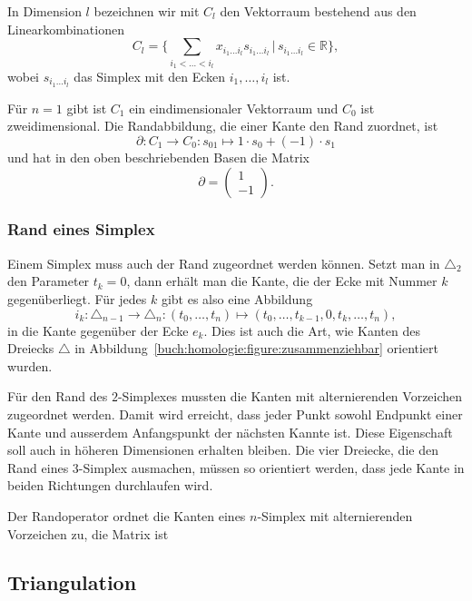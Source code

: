 In Dimension $l$ bezeichnen wir mit $C_l$  den Vektorraum bestehend
aus den Linearkombinationen
\[
C_l
=
\biggl\{
\sum_{i_1<\dots<i_l} x_{i_1\dots i_l} s_{i_1\dots i_l}
\,
\bigg|
\,
s_{i_1\dots i_l}\in\mathbb{R}
\biggr\},
\]
wobei $s_{i_1\dots i_l}$ das Simplex mit den Ecken $i_1,\dots,i_l$ ist.

Für $n=1$ gibt ist $C_1$ ein eindimensionaler Vektorraum und $C_0$
ist zweidimensional.
Die Randabbildung, die einer Kante den Rand zuordnet, ist
\[
\partial
\colon 
C_1\to C_0
:
s_{01}
\mapsto
1\cdot s_0 + (-1)\cdot s_1
\]
und hat in den oben beschriebenden Basen die Matrix
\[
\partial 
=
\begin{pmatrix}
1\\
-1
\end{pmatrix}.
\]

\subsubsection{Rand eines Simplex}
Einem Simplex muss auch der Rand zugeordnet werden können.
Setzt man in $\triangle_2$ den Parameter $t_k=0$, dann erhält
man die Kante,
die der Ecke mit Nummer $k$ gegenüberliegt.
Für jedes $k$ gibt es also eine Abbildung
\[
i_k
\colon
\triangle_{n-1} \to \triangle_n
:
(t_0,\dots,t_n)
\mapsto
(t_0,\dots,t_{k-1},0,t_{k},\dots,t_n),
\]
in die Kante gegenüber der Ecke $e_k$.
Dies ist auch die Art, wie Kanten des Dreiecks $\triangle$ 
in Abbildung~\ref{buch:homologie:figure:zusammenziehbar}
orientiert wurden.

Für den Rand des $2$-Simplexes mussten die Kanten mit alternierenden
Vorzeichen zugeordnet werden.
Damit wird erreicht, dass jeder Punkt sowohl Endpunkt einer 
Kante und
ausserdem Anfangspunkt der nächsten Kannte ist.
Diese Eigenschaft soll auch in höheren Dimensionen erhalten bleiben.
Die vier Dreiecke, die den Rand eines $3$-Simplex ausmachen,
müssen so orientiert werden,
dass jede Kante in beiden Richtungen durchlaufen wird.

\begin{definition}
\label{buch:def:randoperator}
Der Randoperator ordnet die Kanten eines $n$-Simplex mit alternierenden
Vorzeichen zu, die Matrix ist
\[
\]
\end{definition}


\subsection{Triangulation
\label{buch:subsection:}}


